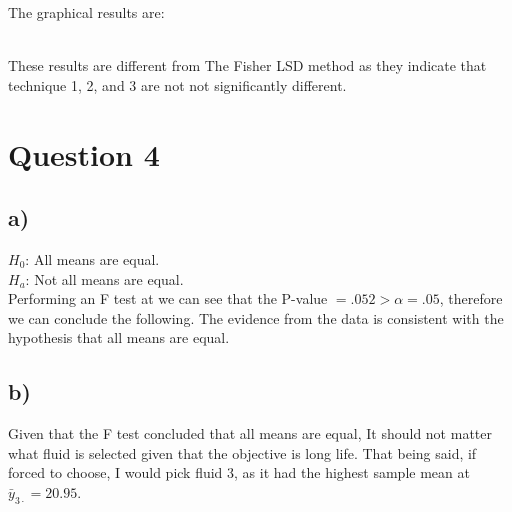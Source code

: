 \documentclass{article}
\begin{document}
The graphical results are: \\
\vspace{12pt}
\\

These results are different from The Fisher LSD method as they indicate that technique 1, 2, and 3 are not not significantly different.


\clearpage
\section*{Question 4}
\subsection*{a)}
$H_0$: All means are equal. \\
$H_a$: Not all means are equal. \\
Performing an F test at we can see that the P-value $ = .052 > \alpha = .05$, therefore we can conclude the following.
The evidence from the data is consistent with the hypothesis that all means are equal.

\subsection*{b)}
Given that the F test concluded that all means are equal, It should not matter what fluid is selected given that the objective is long life.
That being said, if forced to choose, I would pick fluid 3, as it had the highest sample mean at $\bar{y}_{3 \cdot} = 20.95$.
\end{document}
